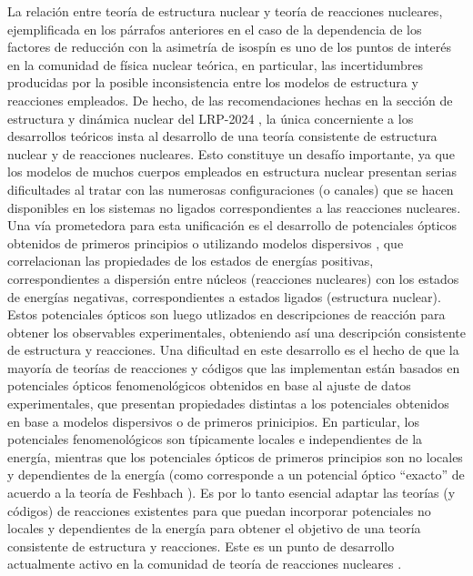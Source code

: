 \documentclass[a4paper,12pt,twoside]{article}
\begin{document}
La relación entre teoría de estructura nuclear y teoría de reacciones nucleares, ejemplificada en los párrafos anteriores en el caso de la dependencia de los factores de reducción con la asimetría de isospín es uno de los puntos de interés en la comunidad de física nuclear teórica, en particular, las incertidumbres producidas por la posible inconsistencia entre los modelos de estructura y reacciones empleados. De hecho, de las recomendaciones hechas en la sección de estructura y dinámica nuclear del LRP-2024 \cite{nupecc}, la única concerniente a los desarrollos teóricos insta al desarrollo de una teoría consistente de estructura nuclear y de reacciones nucleares. Esto constituye un desafío importante, ya que los modelos de muchos cuerpos empleados en estructura nuclear presentan serias dificultades al tratar con las numerosas configuraciones (o canales) que se hacen disponibles en los sistemas no ligados correspondientes a las reacciones nucleares. Una vía prometedora para esta unificación es el desarrollo de potenciales ópticos obtenidos de primeros principios \cite{Idi19} o utilizando modelos dispersivos \cite{Cha07}, que correlacionan las propiedades de los estados de energías positivas, correspondientes a dispersión entre núcleos (reacciones nucleares) con los estados de energías negativas, correspondientes a estados ligados (estructura nuclear). Estos potenciales ópticos son luego utlizados en descripciones de reacción para obtener los observables experimentales, obteniendo así una descripción consistente de estructura y reacciones. Una dificultad en este desarrollo es el hecho de que la mayoría de teorías de reacciones y códigos que las implementan están basados en potenciales ópticos fenomenológicos obtenidos en base al ajuste de datos experimentales, que presentan propiedades distintas a los potenciales obtenidos en base a modelos dispersivos o de primeros prinicipios. En particular, los potenciales fenomenológicos son típicamente locales e independientes de la energía, mientras que los potenciales ópticos de primeros principios son no locales y dependientes de la energía (como corresponde a un potencial óptico ``exacto'' de acuerdo a la teoría de Feshbach \cite{Fes58}). Es por lo tanto esencial adaptar las teorías (y códigos) de reacciones existentes para que puedan incorporar potenciales no locales y dependientes de la energía para obtener el objetivo de una teoría consistente de estructura y reacciones. Este es un punto de desarrollo actualmente activo en la comunidad de teoría de reacciones nucleares \cite{Tim13,Bai16,Tit16,Lov17,Heb21}.
\end{document}
